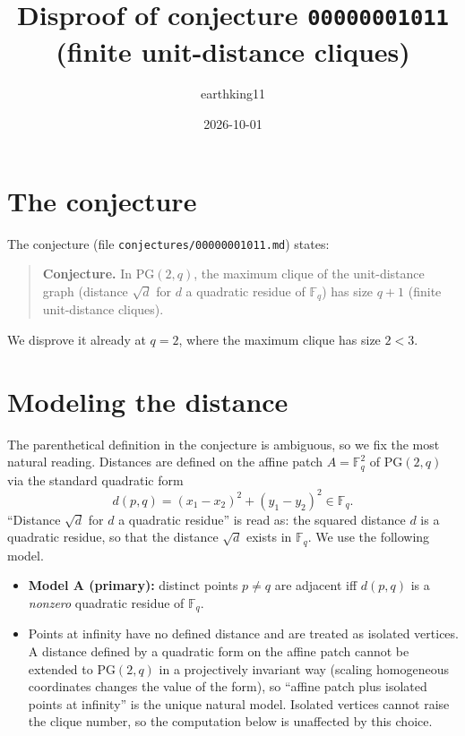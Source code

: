 \documentclass[11pt]{article}
\title{Disproof of conjecture \texttt{00000001011} \\ (finite unit-distance cliques)}
\author{earthking11}
\date{2026-10-01}
\begin{document}
\maketitle

\section{The conjecture}

The conjecture (file \texttt{conjectures/00000001011.md}) states:

\begin{quote}
\textbf{Conjecture.} In $\mathrm{PG}(2,q)$, the maximum clique of the
unit-distance graph (distance $\sqrt{d}$ for $d$ a quadratic residue of
$\mathbb{F}_q$) has size $q+1$ (finite unit-distance cliques).
\end{quote}

We disprove it already at $q=2$, where the maximum clique has size $2<3$.

\section{Modeling the distance}

The parenthetical definition in the conjecture is ambiguous, so we fix the
most natural reading.  Distances are defined on the affine patch
$A=\mathbb{F}_q^2$ of $\mathrm{PG}(2,q)$ via the standard quadratic form
\[
d(p,q)=(x_1-x_2)^2+(y_1-y_2)^2\in\mathbb{F}_q .
\]
``Distance $\sqrt{d}$ for $d$ a quadratic residue'' is read as: the squared
distance $d$ is a quadratic residue, so that the distance $\sqrt{d}$ exists
in $\mathbb{F}_q$.  We use the following model.

\begin{itemize}
\item \textbf{Model A (primary):} distinct points $p\ne q$ are adjacent
  iff $d(p,q)$ is a \emph{nonzero} quadratic residue of $\mathbb{F}_q$.
\item Points at infinity have no defined distance and are treated as
  isolated vertices.  A distance defined by a quadratic form on the affine
  patch cannot be extended to $\mathrm{PG}(2,q)$ in a projectively invariant
  way (scaling homogeneous coordinates changes the value of the form), so
  ``affine patch plus isolated points at infinity'' is the unique natural
  model.  Isolated vertices cannot raise the clique number, so the
  computation below is unaffected by this choice.
\end{itemize}
\end{document}
